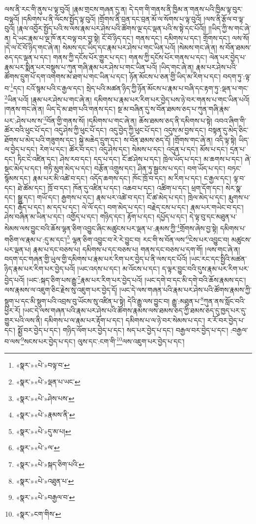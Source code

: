 ལས་ནི་རང་གི་ནུས་པ་ལྟ་བུའོ། །རྣམ་གྲངས་གཞན་དུ་ན། དེ་དག་གི་གནས་ནི་ཁྱིམ་ན་གནས་པའི་ཁྱིམ་ལྟ་བུར་བལྟའོ། །དམིགས་པ་ནི་ལོངས་སྤྱོད་ལྟ་བུའོ། །གྲོགས་ནི་བྲན་དང་བྲན་མོ་ལ་སོགས་པ་ལྟ་བུའོ། །ལས་ནི་རྩོལ་བ་ལྟ་བུའོ། །རྣལ་འབྱོར་སྤྱོད་པའི་ས་ལས་རྣམ་པར་ཤེས་པའི་ཚོགས་ལྔ་དང་ལྡན་པའི་ས་སྟེ་དང་པོའོ།། །།ཡིད་ཀྱི་ས་གང་ཞེ་ན། དེ་ཡང་རྣམ་པ་ལྔ་ཁོ་ནར་བལྟ་བར་བྱ་སྟེ། ངོ་བོ་ཉིད་དང་། གནས་དང་། དམིགས་པ་དང་། གྲོགས་དང་། ལས་སོ། །དེ་ལ་ངོ་བོ་ཉིད་གང་ཞེ་ན། སེམས་དང་ཡིད་དང་རྣམ་པར་ཤེས་པ་གང་ཡིན་པའོ། །སེམས་གང་ཞེ་ན། ས་བོན་ཐམས་ཅད་དང་ལྡན་པ་དང་། གནས་ཀྱི་དངོས་པོར་གྱུར་པ་དང་། གནས་ཀྱི་དངོས་པོར་གནས་པ་དང་། ལེན་པར་བྱེད་པ་རྣམ་པར་སྨིན་པར་བསྡུས་པ་ཀུན་གཞི་རྣམ་པར་ཤེས་པ་གང་ཡིན་པའོ། །ཡིད་གང་ཞེ་ན། རྣམ་པར་ཤེས་པའི་ཚོགས་དྲུག་པོ་དག་འགགས་མ་ཐག་པ་གང་ཡིན་པ་དང་། ཉོན་མོངས་པ་ཅན་གྱི་ཡིད་མ་རིག་པ་དང་། བདག་ཏུ་:ལྟ་བ་\footnote{«སྣར་»«པེ་»བལྟ་བ་}དང་། ངའོ་སྙམ་པའི་ང་རྒྱལ་དང་། སྲེད་པའི་མཚན་ཉིད་ཀྱི་ཉོན་མོངས་པ་རྣམ་པ་བཞི་དང་རྟག་ཏུ་:ལྡན་པ་གང་\footnote{«སྣར་»«པེ་»ལྡན་པ་ཡང་}ཡིན་པའོ། །རྣམ་པར་ཤེས་པ་གང་ཞེ་ན། དམིགས་པ་རྣམ་པར་རིག་པར་བྱེད་པས་ཉེ་བར་གནས་པ་གང་ཡིན་པའོ། །གནས་གང་ཞེ་ན། ཡིད་དེ་མ་ཐག་པའི་གནས་དང་། སྔ་མ་བཞིན་དུ་ས་བོན་ཐམས་ཅད་པ་ཀུན་གཞི་རྣམ་པར་:ཤེས་པས་ས་\footnote{«སྣར་»«པེ་»ཤེས་པས་}བོན་གྱི་གནས་སོ། །དམིགས་པ་གང་ཞེ་ན། ཆོས་ཐམས་ཅད་ནི་དམིགས་པ་སྟེ། འབའ་ཞིག་གི་ཚོར་བའི་ཕུང་པོ་དང་། འདུ་ཤེས་ཀྱི་ཕུང་པོ་དང་། འདུ་བྱེད་ཀྱི་ཕུང་པོ་དང་། འདུས་མ་བྱས་དང་། བསྟན་དུ་མེད་ཅིང་ཐོགས་པ་མེད་པའི་གཟུགས་དང་། སྐྱེ་མཆེད་དྲུག་དང་། ས་བོན་ཐམས་ཅད་དོ། །གྲོགས་གང་ཞེ་ན། འདི་ལྟ་སྟེ། ཡིད་ལ་བྱེད་པ་དང་། རེག་པ་དང་། ཚོར་བ་དང་། འདུ་ཤེས་དང་། སེམས་པ་དང་། འདུན་པ་དང་། མོས་པ་དང་། དྲན་པ་དང་། ཏིང་ངེ་འཛིན་དང་། ཤེས་རབ་དང་། དད་པ་དང་། ངོ་ཚ་ཤེས་པ་དང་། ཁྲེལ་ཡོད་པ་དང་། མ་ཆགས་པ་དང་། ཞེ་སྡང་མེད་པ་དང་། གཏི་མུག་མེད་པ་དང་། བརྩོན་འགྲུས་དང་། ཤིན་ཏུ་སྦྱངས་པ་དང་། བག་ཡོད་པ་དང་། བཏང་སྙོམས་དང་། རྣམ་པར་མི་འཚེ་བ་དང་། འདོད་ཆགས་དང་། ཁོང་ཁྲོ་བ་དང་། མ་རིག་པ་དང་། ང་རྒྱལ་དང་། ལྟ་བ་དང་། ཐེ་ཚོམ་དང་། ཁྲོ་བ་དང་། ཁོན་དུ་འཛིན་པ་དང་། འཆབ་པ་དང་། འཚིག་པ་དང་། ཕྲག་དོག་དང་། སེར་སྣ་དང་། སྒྱུ་དང་། གཡོ་དང་། རྒྱགས་པ་དང་། རྣམ་པར་འཚེ་བ་དང་། ངོ་ཚ་མེད་པ་དང་། ཁྲེལ་མེད་པ་དང་། རྨུགས་པ་དང་། རྒོད་པ་དང་། མ་དད་པ་དང་། ལེ་ལོ་དང་། བག་མེད་པ་དང་། བརྗེད་ངས་པ་དང་། རྣམ་པར་གཡེང་བ་དང་། ཤེས་བཞིན་མ་ཡིན་པ་དང་། འགྱོད་པ་དང་། གཉིད་དང་། རྟོག་པ་དང་། དཔྱོད་པ་དང་། དེ་ལྟ་བུ་དང་མཐུན་པ་སེམས་ལས་བྱུང་བའི་ཆོས་ལྷན་ཅིག་འབྱུང་ཞིང་མཚུངས་པར་ལྡན་པ་:རྣམས་ཀྱི་\footnote{«སྣར་»«པེ་»རྣམས་ནི་}གྲོགས་ཞེས་བྱ་སྟེ། དམིགས་པ་གཅིག་ལ་རྣམ་པ་:དུ་མ་དང་།\footnote{«སྣར་»«པེ་»དུ་མ་པ།} ལྷན་ཅིག་འབྱུང་བ་རེ་རེ་བྱུང་བ། རང་གི་ས་བོན་ལས་\footnote{«སྣར་»«པེ་»ལ་}ངེས་པར་འབྱུང་བ། མཚུངས་པར་ལྡན་པ། རྣམ་པ་དང་བཅས་པ། དམིགས་པ་དང་བཅས་པ། གནས་དང་བཅས་པ་དག་གོ། །ལས་གང་ཞེ་ན། བདག་དང་གཞན་གྱི་ཡུལ་གྱི་དམིགས་པ་རྣམ་པར་རིག་པར་བྱེད་པ་ནི་ལས་དང་པོའོ། །ཡང་རང་དང་སྤྱིའི་མཚན་ཉིད་རྣམ་པར་རིག་པར་བྱེད་པའོ། །ཡང་འདས་པ་དང་། མ་འོངས་པ་དང་། ད་ལྟར་བྱུང་བའི་དུས་རྣམ་པར་རིག་པར་བྱེད་པའོ། །ཡང་:སྐད་ཅིག་པས་རྒྱུ་\footnote{«སྣར་»«པེ་»སྐད་ཅིག་པའི་}རྣམ་པར་རིག་པར་བྱེད་པའོ། །ཡང་དགེ་བ་དང་མི་དགེ་བའི་ཆོས་རྣམས་དང་། ལས་རྣམས་ལ་འཇུག་ཅིང་རྗེས་སུ་འཇུག་པར་བྱེད་དོ། །ཡང་དེ་ལས་གཞན་པའི་རྣམ་པར་ཤེས་པའི་ཚོགས་རྣམས་ཀྱི་སྡུག་པ་དང་མི་སྡུག་པའི་འབྲས་བུ་ཡོངས་སུ་འཛིན་པ་སྟེ། དེའི་རྒྱུ་ལས་བྱུང་བ། རྒྱུ་:མཐུན་པ་\footnote{«སྣར་»«པེ་»འཐུན་པ་}ཀུན་ནས་སློང་བའི་ཕྱིར་རོ། །ཡང་དེ་ལས་གཞན་པའི་རྣམ་པར་ཤེས་པའི་ཚོགས་རྣམས་ལས་ཐམས་ཅད་ཀྱི་ཐམས་ཅད་དུ་ཁྱད་པར་དུ་གྱུར་པའི་ལས་ནི། དམིགས་པ་ལ་རྣམ་པར་རྟོག་པ་དང་། དམིགས་པ་ལ་ཉེ་བར་སེམས་པ་དང་། ར་རོ་བར་བྱེད་པ་དང་། སྨྱོ་བར་བྱེད་པ་དང་། གཉིད་ལོག་པར་བྱེད་པ་དང་། སད་པར་བྱེད་པ་དང་། བརྒྱལ་བར་བྱེད་པ་དང་། :བརྒྱལ་བ་ལས་\footnote{«སྣར་»«པེ་»བརྒྱལ་བ་}སངས་པར་བྱེད་པ་དང་། ལུས་དང་:ངག་གི་\footnote{«སྣར་»ངག་གིས་}ལས་འཇུག་པར་བྱེད་པ་དང་། 